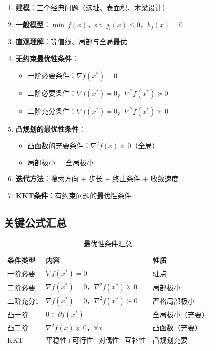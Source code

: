 \begin{conceptbox}
\begin{enumerate}[label=\arabic*., leftmargin=2em]
    \item \textbf{建模}：三个经典问题（选址、表面积、木梁设计）
    \item \textbf{一般模型}：$\min\ f(x)$，s.t. $g_i(x) \leq 0$，$h_j(x) = 0$
    \item \textbf{直观理解}：等值线、局部与全局最优
    \item \textbf{无约束最优性条件}：
    \begin{itemize}
        \item 一阶必要条件：$\nabla f(x^*) = 0$
        \item 二阶必要条件：$\nabla f(x^*) = 0$，$\nabla^2 f(x^*) \succeq 0$
        \item 二阶充分条件：$\nabla f(x^*) = 0$，$\nabla^2 f(x^*) \succ 0$
    \end{itemize}
    \item \textbf{凸规划的最优性条件}：
    \begin{itemize}
        \item 凸函数的充要条件：$\nabla^2 f(x) \succeq 0$（全局）
        \item 局部极小 = 全局极小
    \end{itemize}
    \item \textbf{迭代方法}：搜索方向 + 步长 + 终止条件 + 收敛速度
    \item \textbf{KKT条件}：有约束问题的最优性条件
\end{enumerate}
\end{conceptbox}

\subsection{关键公式汇总}

\begin{table}[htbp]
\centering
\caption{最优性条件汇总}
\begin{tabular}{@{}lll@{}}
\toprule
\textbf{条件类型} & \textbf{内容} & \textbf{性质} \\
\midrule
一阶必要 & $\nabla f(x^*) = 0$ & 驻点 \\
二阶必要 & $\nabla f(x^*) = 0$，$\nabla^2 f(x^*) \succeq 0$ & 局部极小 \\
二阶充分1 & $\nabla f(x^*) = 0$，$\nabla^2 f(x^*) \succ 0$ & 严格局部极小 \\
凸一阶 & $0 \in \partial f(x^*)$ & 全局极小（充要） \\
凸二阶 & $\nabla^2 f(x) \succeq 0$，$\forall x$ & 凸函数（充要） \\
KKT & 平稳性+可行性+对偶性+互补性 & 凸规划充要 \\
\bottomrule
\end{tabular}
\end{table}


